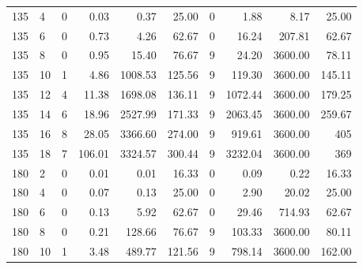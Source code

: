 \begin{appendices}
\begin{table*}[h]
\begin{center}
\begin{tabular} {l l | r r r r | r r r r}
135 & 4                             &  0                 &  0.03          &  0.37       &  25.00       &  0          &  1.88            &  8.17       &  25.00     \\ 
135 & 6                             &  0                 &  0.73          &  4.26       &  62.67       &  0          &  16.24           &  207.81     &  62.67     \\ 
135 & 8                             &  0                 &  0.95          &  15.40      &  76.67       &  9          &  24.20           &  3600.00    &  78.11     \\ 
135 & 10                            &  1                 &  4.86          &  1008.53    &  125.56      &  9          &  119.30          &  3600.00    &  145.11    \\ 
135 & 12                            &  4                 &  11.38         &  1698.08    &  136.11      &  9          &  1072.44         &  3600.00    &  179.25    \\ 
135 & 14                            &  6                 &  18.96         &  2527.99    &  171.33      &  9          &  2063.45         &  3600.00    &  259.67    \\ 
135 & 16                            &  8                 &  28.05         &  3366.60    &  274.00      &  9          &  919.61          &  3600.00    &  405       \\ 
135 & 18                            &  7                 &  106.01        &  3324.57    &  300.44      &  9          &  3232.04         &  3600.00    &  369       \\ 
180 & 2                             &  0                 &  0.01          &  0.01       &  16.33       &  0          &  0.09            &  0.22       &  16.33     \\ 
180 & 4                             &  0                 &  0.07          &  0.13       &  25.00       &  0          &  2.90            &  20.02      &  25.00     \\ 
180 & 6                             &  0                 &  0.13          &  5.92       &  62.67       &  0          &  29.46           &  714.93     &  62.67     \\ 
180 & 8                             &  0                 &  0.21          &  128.66     &  76.67       &  9          &  103.33          &  3600.00    &  80.11     \\ 
180 & 10                            &  1                 &  3.48          &  489.77     &  121.56      &  9          &  798.14          &  3600.00    &  162.00    \\ 

\end{tabular}
\end{center}
\end{table*}
\end{appendices}
